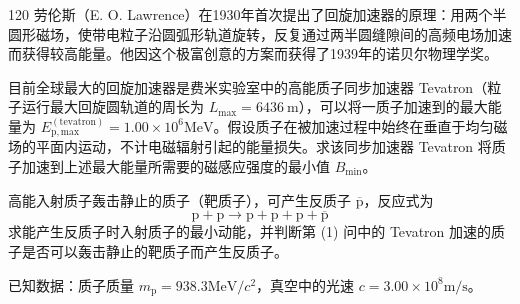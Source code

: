 \begin{problem}[2020第37届全国中学生物理竞赛复赛][回旋加速器原理与反质子产生]{120}
    劳伦斯（E. O. Lawrence）在1930年首次提出了回旋加速器的原理：用两个半圆形磁场，使带电粒子沿圆弧形轨道旋转，反复通过两半圆缝隙间的高频电场加速而获得较高能量。他因这个极富创意的方案而获得了1939年的诺贝尔物理学奖。
    \begin{subproblem}
        目前全球最大的回旋加速器是费米实验室中的高能质子同步加速器 Tevatron（粒子运行最大回旋圆轨道的周长为 $L_{\max} = 6436 \mathrm{~m}$），可以将一质子加速到的最大能量为 $E_{\mathrm{p,max}}^{(\mathrm{tevatron})} = 1.00 \times 10^{6} \mathrm{MeV}$。假设质子在被加速过程中始终在垂直于均匀磁场的平面内运动，不计电磁辐射引起的能量损失。求该同步加速器 Tevatron 将质子加速到上述最大能量所需要的磁感应强度的最小值 $B_{\min}$。
    \end{subproblem}
    \begin{subproblem}
        高能入射质子轰击静止的质子（靶质子），可产生反质子 $\overline{\mathrm{p}}$，反应式为
        \begin{equation}
            \mathrm{p} + \mathrm{p} \rightarrow \mathrm{p} + \mathrm{p} + \mathrm{p} + \overline{\mathrm{p}}
        \end{equation}
        求能产生反质子时入射质子的最小动能，并判断第 (1) 问中的 Tevatron 加速的质子是否可以轰击静止的靶质子而产生反质子。

        已知数据：质子质量 $m_{\mathrm{p}} = 938.3 \mathrm{MeV} / c^{2}$，真空中的光速 $c = 3.00 \times 10^{8} \mathrm{m/s}$。
    \end{subproblem}
\end{problem}